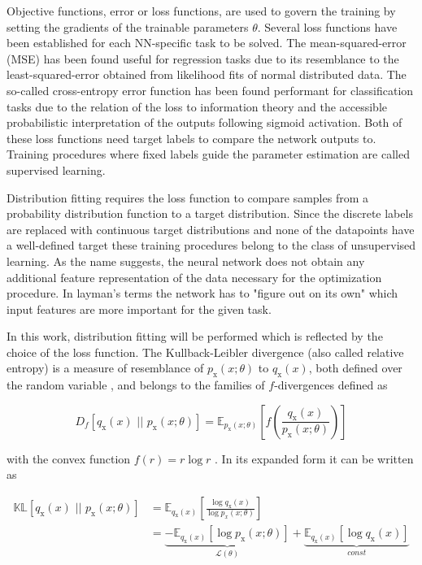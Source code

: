 
Objective functions, error or loss functions, are used to govern the training by setting the gradients of the trainable parameters $\theta$.
Several loss functions have been established for each NN-specific task to be solved. The mean-squared-error (MSE) has been found useful for regression tasks due to its resemblance to the least-squared-error obtained from likelihood fits of normal distributed data. The so-called cross-entropy error function has been found performant for classification tasks due to the relation of the loss to information theory and the accessible probabilistic interpretation of the outputs following sigmoid activation. Both of these loss functions need target labels to compare the network outputs to. Training procedures where fixed labels guide the parameter estimation are called supervised learning.

Distribution fitting requires the loss function to compare samples from a probability distribution function to a target distribution. Since the discrete labels are replaced with continuous target distributions and none of the datapoints have a well-defined target these training procedures belong to the class of unsupervised learning. As the name suggests, the neural network does not obtain any additional feature representation of the data necessary for the optimization procedure. In layman's terms the network has to "figure out on its own" which input features are more important for the given task.

In this work, distribution fitting will be performed which is reflected by the choice of the loss function. The Kullback-Leibler divergence (also called relative entropy) is a measure of resemblance of $p_\text{x}(x; \theta)$ to $q_\text{x}(x)$, both defined over the random variable , and belongs to the families of $f$-divergences defined as

\begin{equation*}
	D_f\left[q_\text{x}(x) \, \, || \, \, p_\text{x}(x; \theta)\right] = \mathbb{E}_{p_\text{x}(x; \theta)}\left[f\left(\frac{q_\text{x}(x)}{p_\text{x}(x; \theta)}\right)\right]
\end{equation*}

with the convex function $f(r) = r\log r$ \cite{Papamakarios_NF}. In its expanded form it can be written as

\begin{equation}
	\begin{aligned}
		\mathbb{KL}\left[q_\text{x}(x) \, \, || \, \, p_\text{x}(x; \theta)\right] &= \mathbb{E}_{q_\text{x}(x)}\left[\frac{\log q_\text{x}(x)}{\log p_x(x; \theta)}\right] \\&= \underbrace{- \mathbb{E}_{q_\text{x}(x)} \left[ \log p_\text{x}(x; \theta)\right]}_{\mathcal{L}(\theta)} + \underbrace{\mathbb{E}_{q_\text{x}(x)}\left[\log q_\text{x}(x)\right]}_{const}
	\end{aligned}
	\label{eq:KL-loss}
\end{equation}

